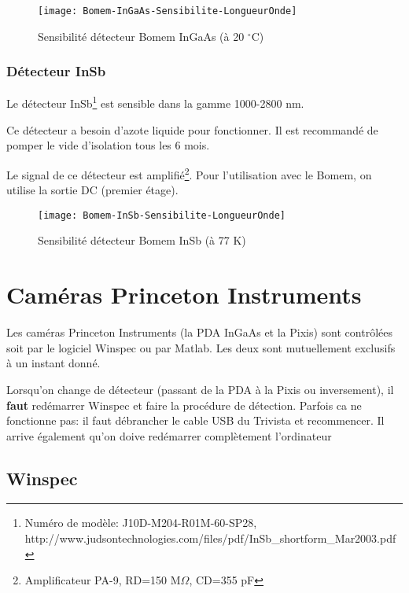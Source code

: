 \documentclass[11pt,francais]{book} %
\begin{document}
\begin{figure}[htbp]
  \centering\texttt{[image: Bomem-InGaAs-Sensibilite-LongueurOnde]}
  \caption{Sensibilité détecteur Bomem InGaAs (à 20 $^{\circ}$C)}
  \label{fig:bomemInGaAs}
\end{figure}



\subsubsection{Détecteur InSb}
Le détecteur InSb\footnote{Numéro de modèle: J10D-M204-R01M-60-SP28, http://www.judsontechnologies.com/files/pdf/InSb\_shortform\_Mar2003.pdf} est sensible dans la gamme 1000-2800 nm.

Ce détecteur a besoin d'azote liquide pour fonctionner.
Il est recommandé de pomper le vide d'isolation tous les 6 mois.

Le signal de ce détecteur est amplifié\footnote{Amplificateur PA-9, RD=150 M$\Omega$, CD=355 pF}.
Pour l'utilisation avec le Bomem, on utilise la sortie DC (premier étage).

\begin{figure}[htbp]
  \centering\texttt{[image: Bomem-InSb-Sensibilite-LongueurOnde]}
  \caption{Sensibilité détecteur Bomem InSb (à 77 K)}
  \label{fig:bomemInSb}
\end{figure}



\section{Caméras Princeton Instruments}

Les caméras Princeton Instruments (la PDA InGaAs et la Pixis) sont contrôlées soit par le logiciel Winspec ou par Matlab.
Les deux sont mutuellement exclusifs à un instant donné.

Lorsqu'on change de détecteur (passant de la PDA à la Pixis ou inversement), il {\bf faut} redémarrer Winspec et faire la procédure de détection.
Parfois ca ne fonctionne pas: il faut débrancher le cable USB du Trivista et recommencer.
Il arrive également qu'on doive redémarrer complètement l'ordinateur

\subsection{Winspec}
\end{document}
